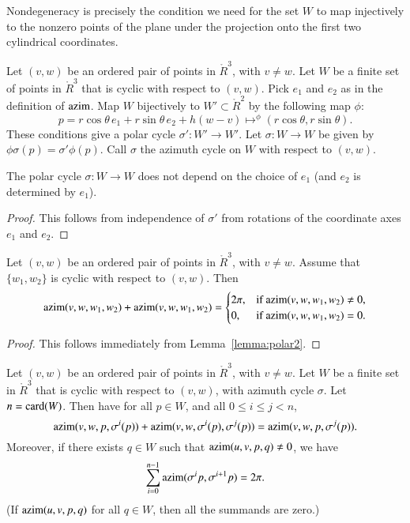 Nondegeneracy is precisely the condition we need for the
set $W$ to map injectively to the nonzero points of the 
plane under the projection
onto the first two cylindrical coordinates.

\begin{definition}
Let $(v,w)$ be an ordered pair of points in
$\ring{R}^3$, with $v\ne w$.
Let $W$ be a finite set of points in $\ring{R}^3$ that is
cyclic  with respect to $(v,w)$.
Pick $e_1$ and $e_2$ as in the definition
of ${\operatorname{azim}}$.  Map 
$W$ bijectively to $W'\subset\ring{R}^2$ by the following map $\phi$:
   $$p =  r\cos\theta\, e_1 + r\sin\theta\, e_2 + h (w-v) \mapsto^\phi
     (r\cos\theta,r\sin\theta).$$
These conditions give a polar cycle $\sigma':W'\to W'$.  Let
$\sigma:W\to W$ be given by $\phi\sigma(p) =\sigma'\phi(p)$.
Call $\sigma$ the azimuth cycle
on $W$ with respect to $(v,w)$.
\end{definition}

\begin{lemma} The polar cycle $\sigma:W\to W$ does not depend
on the choice of $e_1$ (and $e_2$ is determined by $e_1$).
\end{lemma}

\begin{proof} This follows from independence of $\sigma'$ from
rotations of the coordinate axes $e_1$ and $e_2$.
\end{proof}


\begin{lemma} Let $(v,w)$ be an ordered pair of points in $\ring{R}^3$,
with $v\ne w$.  Assume that $\{w_1,w_2\}$ is cyclic
with respect to $(v,w)$.  Then
  $$
  {\operatorname{azim}}(v,w,w_1,w_2) + {\operatorname{azim}}(v,w,w_1,w_2) 
  = \begin{cases} 2\pi, & \text{if }{\operatorname{azim}}(v,w,w_1,w_2)\ne 0,\\
    0, & \text{if }{\operatorname{azim}}(v,w,w_1,w_2)=0.
    \end{cases}
    $$
\end{lemma}

\begin{proof} This follows immediately from Lemma~\ref{lemma:polar2}.
\end{proof}

\begin{lemma} Let $(v,w)$ be an ordered pair of points in $\ring{R}^3$,
with $v\ne w$.  Let $W$ be a finite set in $\ring{R}^3$ that
is cyclic with respect to $(v,w)$,
with azimuth cycle $\sigma$.
Let $n={\operatorname{card}}(W)$.  Then have for all $p\in W$,
and all $0\le i \le j < n$,
   $$
   {\operatorname{azim}}(v,w,p,\sigma^i(p)) +
    {\operatorname{azim}}(v,w,\sigma^i(p),\sigma^j(p)) =
   {\operatorname{azim}}(v,w,p,\sigma^j(p)).
   $$
Moreover, if there exists $q\in W$ such that 
${\operatorname{azim}}(u,v,p,q)\ne0$,
we have 
  $$
  \sum_{i=0}^{n-1} {\operatorname{azim}}(\sigma^ip,\sigma^{i+1}p) = 2\pi.
  $$
(If ${\operatorname{azim}}(u,v,p,q)$ for all $q\in W$, then all the
summands are zero.)
\end{lemma}

